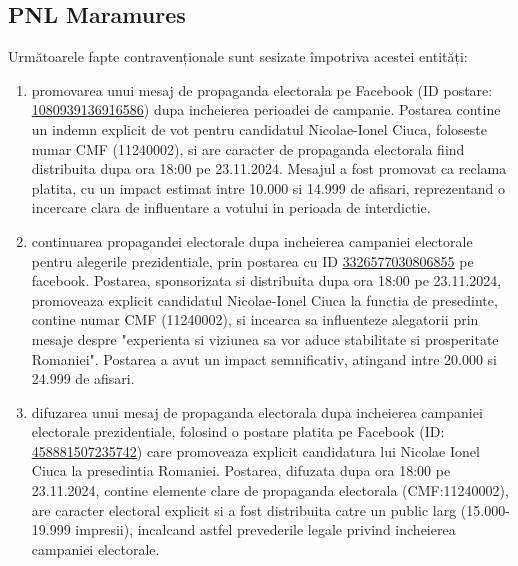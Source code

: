 \documentclass[a4paper,12pt]{article}
\begin{document}
\vspace{0.5cm}

\subsection{PNL Maramures}
Următoarele fapte contravenționale sunt sesizate împotriva acestei entități:

\begin{enumerate}[leftmargin=*, label=\arabic*.)]
    \item promovarea unui mesaj de propaganda electorala pe Facebook (ID postare: \href{https://www.facebook.com/ads/library/?id=1080939136916586}{1080939136916586}) dupa incheierea perioadei de campanie. Postarea contine un indemn explicit de vot pentru candidatul Nicolae-Ionel Ciuca, foloseste numar CMF (11240002), si are caracter de propaganda electorala fiind distribuita dupa ora 18:00 pe 23.11.2024. Mesajul a fost promovat ca reclama platita, cu un impact estimat intre 10.000 si 14.999 de afisari, reprezentand o incercare clara de influentare a votului in perioada de interdictie.
    \item continuarea propagandei electorale dupa incheierea campaniei electorale pentru alegerile prezidentiale, prin postarea cu ID \href{https://www.facebook.com/ads/library/?id=3326577030806855}{3326577030806855} pe facebook. Postarea, sponsorizata si distribuita dupa ora 18:00 pe 23.11.2024, promoveaza explicit candidatul Nicolae-Ionel Ciuca la functia de presedinte, contine numar CMF (11240002), si incearca sa influenteze alegatorii prin mesaje despre "experienta si viziunea sa vor aduce stabilitate si prosperitate Romaniei". Postarea a avut un impact semnificativ, atingand intre 20.000 si 24.999 de afisari.
    \item difuzarea unui mesaj de propaganda electorala dupa incheierea campaniei electorale prezidentiale, folosind o postare platita pe Facebook (ID: \href{https://www.facebook.com/ads/library/?id=458881507235742}{458881507235742}) care promoveaza explicit candidatura lui Nicolae Ionel Ciuca la presedintia Romaniei. Postarea, difuzata dupa ora 18:00 pe 23.11.2024, contine elemente clare de propaganda electorala (CMF:11240002), are caracter electoral explicit si a fost distribuita catre un public larg (15.000-19.999 impresii), incalcand astfel prevederile legale privind incheierea campaniei electorale.
\end{enumerate}

\vspace{0.5cm}
\end{document}
